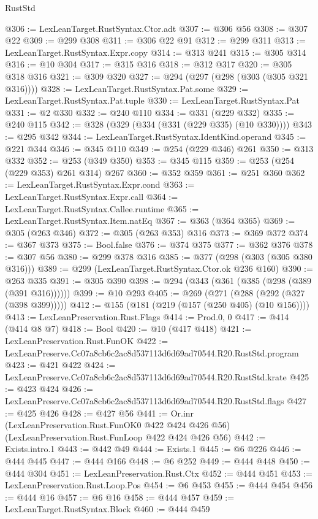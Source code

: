 \begin{lexlean}{RustStd}
\begin{coremodule}
@306 := LexLeanTarget.RustSyntax.Ctor.adt
@307 := @306 @56
@308 := @307 @22
@309 := @299 @308
@311 := @306 @22 @91
@312 := @299 @311
@313 := LexLeanTarget.RustSyntax.Expr.copy
@314 := @313 @241
@315 := @305 @314
@316 := @10 @304
@317 := @315 @316
@318 := @312 @317
@320 := @305 @318 @316
@321 := @309 @320
@327 := @294 (@297 (@298 (@303 (@305 @321 @316))))
@328 := LexLeanTarget.RustSyntax.Pat.some
@329 := LexLeanTarget.RustSyntax.Pat.tuple
@330 := LexLeanTarget.RustSyntax.Pat
@331 := @2 @330
@332 := @240 @110
@334 := @331 (@229 @332)
@335 := @240 @115
@342 := @328 (@329 (@334 (@331 (@229 @335) (@10 @330))))
@343 := @295 @342
@344 := LexLeanTarget.RustSyntax.IdentKind.operand
@345 := @221 @344
@346 := @345 @110
@349 := @254 (@229 @346) @261
@350 := @313 @332
@352 := @253 (@349 @350)
@353 := @345 @115
@359 := @253 (@254 (@229 @353) @261 @314) @267
@360 := @352 @359
@361 := @251 @360
@362 := LexLeanTarget.RustSyntax.Expr.cond
@363 := LexLeanTarget.RustSyntax.Expr.call
@364 := LexLeanTarget.RustSyntax.Callee.runtime
@365 := LexLeanTarget.RustSyntax.Item.natEq
@367 := @363 (@364 @365)
@369 := @305 (@263 @346)
@372 := @305 (@263 @353) @316
@373 := @369 @372
@374 := @367 @373
@375 := Bool.false
@376 := @374 @375
@377 := @362 @376
@378 := @307 @56
@380 := @299 @378 @316
@385 := @377 (@298 (@303 (@305 @380 @316)))
@389 := @299 (LexLeanTarget.RustSyntax.Ctor.ok @236 @160)
@390 := @263 @335
@391 := @305 @390
@398 := @294 (@343 (@361 (@385 (@298 (@389 (@391 @316))))))
@399 := @10 @293
@405 := @269 (@271 (@288 (@292 (@327 (@398 @399)))))
@412 := @155 (@181 (@219 (@157 (@250 @405) (@10 @156))))
@413 := LexLeanPreservation.Rust.Flags
@414 := Prod.{0, 0}
@417 := @414 (@414 @8 @7)
@418 := Bool
@420 := @10 (@417 @418)
@421 := LexLeanPreservation.Rust.FunOK
@422 := LexLeanPreserve.Cc07a8cb6c2ac8d537113d6d69ad70544.R20.RustStd.program
@423 := @421 @422
@424 := LexLeanPreserve.Cc07a8cb6c2ac8d537113d6d69ad70544.R20.RustStd.krate
@425 := @423 @424
@426 := LexLeanPreserve.Cc07a8cb6c2ac8d537113d6d69ad70544.R20.RustStd.flags
@427 := @425 @426
@428 := @427 @56
@441 := Or.inr
    (LexLeanPreservation.Rust.FunOK0 @422 @424 @426 @56)
    (LexLeanPreservation.Rust.FunLoop @422 @424 @426 @56)
@442 := Exists.intro.{1}
@443 := @442 @49
@444 := Exists.{1}
@445 := @6 @226
@446 := @444 @445
@447 := @444 @166
@448 := @6 @252
@449 := @444 @448
@450 := @444 @304
@451 := LexLeanPreservation.Rust.Ctx
@452 := @444 @451
@453 := LexLeanPreservation.Rust.Loop.Pos
@454 := @6 @453
@455 := @444 @454
@456 := @444 @16
@457 := @6 @16
@458 := @444 @457
@459 := LexLeanTarget.RustSyntax.Block
@460 := @444 @459

\end{coremodule}
\end{lexlean}
